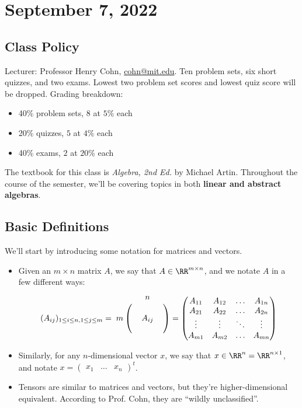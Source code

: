 \section{September 7, 2022}

\subsection{Class Policy}

Lecturer: Professor Henry Cohn, \url{cohn@mit.edu}. Ten problem sets, six short quizzes, and two exams. Lowest two problem set scores and lowest quiz score will be dropped. Grading breakdown:
\begin{itemize}
    \item 40\% problem sets, $8$ at $5\%$ each
    \item 20\% quizzes, $5$ at $4\%$ each
    \item 40\% exams, $2$ at $20\%$ each
\end{itemize}
The textbook for this class is \textit{Algebra, 2nd Ed.} by Michael Artin. Throughout the course of the semester, we'll be covering topics in both \textbf{linear and abstract algebras}. 

\subsection{Basic Definitions}

\begin{definition}

We'll start by introducing some notation for matrices and vectors.
\end{definition}

\begin{itemize}
    \item Given an $m\times n$ matrix $A$, we say that $A\in \RR^{m\times n}$, and we notate $A$ in a few different ways:
\[(A_{ij})_{1\leq i\leq n, 1\leq j\leq m}=\bordermatrix{ &&n&\cr
                &&&\cr
                m&&A_{ij}&\cr
                &&&} = 
\begin{pmatrix}A_{11}&A_{12}&\hdots & A_{1n}\\
A_{21}&A_{22}&\hdots & A_{2n}\\
\vdots &\vdots &\ddots &\vdots \\
A_{m1}&A_{m2}&\hdots & A_{mn}
\end{pmatrix}\]
    \item Similarly, for any $n$-dimensional vector $x$, we say that $x\in \RR^n = \RR^{n\times 1}$, and notate $x=\begin{pmatrix}x_1 & \hdots & x_n\end{pmatrix}^t$.
    \item Tensors are similar to matrices and vectors, but they're higher-dimensional equivalent. According to Prof. Cohn, they are ``wildly unclassified''. 
\end{itemize}

